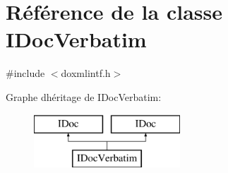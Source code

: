 \hypertarget{class_i_doc_verbatim}{}\section{Référence de la classe I\+Doc\+Verbatim}
\label{class_i_doc_verbatim}


{\ttfamily \#include $<$doxmlintf.\+h$>$}

Graphe d\textquotesingle{}héritage de I\+Doc\+Verbatim\+:\begin{figure}[H]
\begin{center}
\leavevmode
\includegraphics[height=2.000000cm]{class_i_doc_verbatim}
\end{center}
\end{figure}
